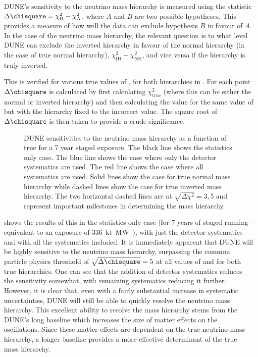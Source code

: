 DUNE's sensitivity to the neutrino mass hierarchy is measured using the statistic $\Delta \chisquare = \chi^{2}_{\text{B}} - \chi^{2}_{\text{A}}$, where $A$ and $B$ are two possible hypotheses.
This provides a measure of how well the data can exclude hypothesis $B$ in favour of $A$.
In the case of the neutrino mass hierarchy, the relevant question is to what level DUNE can exclude the inverted hierarchy in favour of the normal hierarchy (in the case of true normal hierarchy), $\chi^{2}_{\text{IH}} - \chi^{2}_{\text{NH}}$, and vice versa if the hierarchy is truly inverted.

This is verified for various true values of \dcp, for both hierarchies in .
For each \dcp point $\Delta \chisquare$ is calculated by first calculating $\chi^{2}_{\text{true}}$ (where this can be either the normal or inverted hierarchy) and then calculating the \chisquare value for the same value of \dcp but with the hierarchy fixed to the incorrect value.
The square root of $\Delta \chisquare$ is then taken to provide a crude significance.

\begin{figure}[h]
	\begin{adjustbox}{max totalsize=.6\linewidth, center}
		
	\end{adjustbox}
	\caption[DUNE sensitivity to the neutrino mass hierarchy as a function of true \dcp.]{DUNE sensitivities to the neutrino mass hierarchy as a function of true \dcp for a 7 year staged exposure. The black line shows the statistics only case. The blue line shows the case where only the detector systematics are used. The red line shows the case where all systematics are used. Solid lines show the case for true normal mass hierarchy while dashed lines show the case for true inverted mass hierarchy. The two horizontal dashed lines are at $\sqrt{\Delta\chi^{2}} = 3, 5$ and represent important milestones in determining the mass hierarchy.}
	\label{fig:mhSens}
\end{figure}

 shows the results of this in the statistics only case (for 7 years of staged running - equivalent to an exposure of \SI{336}{\kilo\tonne\mega\watt\year}), with just the detector systematics and with all the systematics included.
It is immediately apparent that DUNE will be highly sensitive to the neutrino mass hierarchy, surpassing the common particle physics threshold of $\sqrt{\Delta \chisquare} = 5$ at all values of \dcp and for both true hierarchies.
One can see that the addition of detector systematics reduces the sensitivity somewhat, with remaining systematics reducing it further.
However, it is clear that, even with a fairly substantial increase in systematic uncertainties, DUNE will still be able to quickly resolve the neutrino mass hierarchy.
This excellent ability to resolve the mass hierarchy stems from the DUNE's long baseline which increases the size of matter effects on the oscillations. 
Since these matter effects are dependent on the true neutrino mass hierarchy, a longer baseline provides a more effective determinant of the true mass hierarchy.

